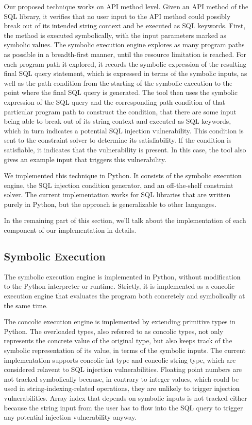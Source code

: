 \documentclass[conference]{IEEEtran}
\begin{document}
Our proposed technique works on API method level. Given an API method of the SQL library, it verifies that no user input to the API method could possibly break out of its intended string context and be executed as SQL keywords.
First, the method is executed symbolically, with the input parameters marked as symbolic values. The symbolic execution engine explores as many program paths as possible in a breadth-first manner, until the resource limitation is reached. For each program path it explored, it records the symbolic expression of the resulting final SQL query statement, which is expressed in terms of the symbolic inputs, as well as the path condition from the starting of the symbolic execution to the point where the final SQL query is generated. The tool then uses the symbolic expression of the SQL query and the corresponding path condition of that particular program path to construct the condition, that there are some input being able to break out of its string context and executed as SQL keywords, which in turn indicates a potential SQL injection vulnerability. This condition is sent to the constraint solver to determine its satisfiability. If the condition is satisfiable, it indicates that the vulnerability is present. In this case, the tool also gives an example input that triggers this vulnerability.

We implemented this technique in Python. It consists of the symbolic execution engine, the SQL injection condition generator, and an off-the-shelf constraint solver.
The current implementation works for SQL libraries that are written purely in Python, but the approach is generalizable to other languages.

In the remaining part of this section, we'll talk about the implementation of each component of our implementation in details.

\subsection{Symbolic Execution}
\label{symbolic execution}

The symbolic execution engine is implemented in Python, without modification to the Python interpreter or runtime. Strictly, it is implemented as a concolic execution engine that evaluates the program both concretely and symbolically at the same time.

The concolic execution engine is implemented by extending primitive types in Python. The overloaded types, also referred to as concolic types, not only represents the concrete value of the original type, but also keeps track of the symbolic representation of its value, in terms of the symbolic inputs. The current implementation supports concolic int type and concolic string type, which are considered relavent to SQL injection vulnerabilities. Floating point numbers are not tracked symbolically because, in contrary to integer values, which could be used in string-indexing-related operations, they are unlikely to trigger injection vulnerabilities. Array index that depends on symbolic inputs is not tracked either because the string input from the user has to flow into the SQL query to trigger any potential injection vulnerability anyway.
\end{document}
